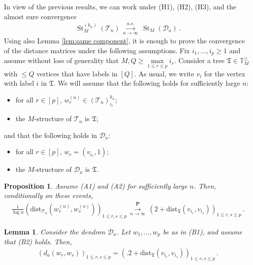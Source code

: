 \documentclass{article}
\newtheorem{lemma}[theorem]{Lemma}
\newtheorem{proposition}[theorem]{Proposition}
\theoremstyle{remark}
\newcommand{\bT}{\mathbb{T}}
\newcommand{\cv}[1]{\,\underset{#1}{\longrightarrow}\,}
\newcommand{\dist}{\mathrm{dist}}
\newcommand{\cT}{\mathcal{T}}
\newcommand{\cD}{\mathcal{D}}
\newcommand{\bP}{\mathbf{P}}
\DeclareMathOperator{\St}{St}
\begin{document}
In view of the previous results, we can work under (H1), (H2), (H3), and the almost sure convergence 
\begin{align*}
\St_M^{(k_n)}(\cT_n) \overset{a.s.}{\cv{n\to\infty}} \St_M(\cD_a) \,.
\end{align*}
Using also Lemma \ref{lem:same component}, it is enough to prove the convergence of the distance matrices under the following assumptions. Fix $i_1, \ldots, i_p \geq 1$ and assume without loss of generality that $M,Q \geq \max\limits_{1 \leq r \leq p} i_r$. Consider a tree $\mathfrak{T} \in \bT^\geq_M$ with $\leq Q$ vertices that have labels in $[Q]$.
As usual, we write $v_i$ for the vertex with label $i$ in $\mathfrak{T}$.
We will assume that the following holds for sufficiently large $n$:
\begin{itemize}
    \item[(A1)] for all $r \in [p]$, $w_r^{(n)} \in (\cT_n)_{i_r}^{k_n}$;
    \item[(A2)] the $M$-structure of $\cT_n$ is $\mathfrak{T}$;
\end{itemize}
and that the following holds in $\cD_a$:
\begin{itemize}
    \item[(B1)] for all $r \in [p]$, $w_{r} = (v_{i_r},1)$;
    \item[(B2)] the $M$-structure of $\cD_a$ is $\mathfrak{T}$.
\end{itemize}

\begin{proposition}
\label{prop:spanned subtree}
Assume (A1) and (A2) for sufficiently large $n$. 
Then, conditionally on these events,
\begin{align*}
    \frac{1}{\log n} \left( \dist_{\cT_n}(w_r^{(n)},w_s^{(n)}) \right)_{1 \leq r,s \leq p}
    \overset{\bP}{\cv{n\to\infty}}
    \left( 2+\dist_{\mathfrak{T}}(v_{i_r},v_{i_s}) \right)_{1 \leq r,s \leq p} \,.
\end{align*}
\end{proposition}

\begin{lemma}
\label{lem: distances in a dendron}
Consider the dendron $\cD_a$. 
Let $w_1, \dots, w_p$ be as in (B1), 
and assume that (B2) holds. 
Then,
\begin{align*}
    \left( d_a(w_{r},w_{s}) \right)_{1 \leq r,s \leq p} = \left(\big. 2+\dist_{\mathfrak{T}}(v_{i_r},v_{i_s})\right)_{1 \leq r,s \leq p} \,.
\end{align*}
\end{lemma}
\end{document}
